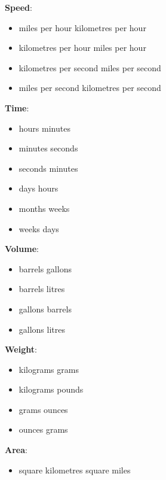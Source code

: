 \documentclass[11pt]{article}
\begin{document}
\noindent \textbf{Speed}:
\begin{itemize}
    \setlength\itemsep{0.05em}
    \item miles per hour  kilometres per hour
    \item kilometres per hour  miles per hour
    \item kilometres per second  miles per second
    \item miles per second  kilometres per second
\end{itemize}

\noindent \textbf{Time}:
\begin{itemize}
    \setlength\itemsep{0.05em}
    \item hours  minutes
    \item minutes  seconds
    \item seconds  minutes
    \item days  hours
    \item months  weeks
    \item weeks  days
\end{itemize}

\noindent \textbf{Volume}:
\begin{itemize}
    \setlength\itemsep{0.05em}
    \item barrels  gallons
    \item barrels  litres
    \item gallons  barrels
    \item gallons  litres
\end{itemize}

\noindent \textbf{Weight}:
\begin{itemize}
    \setlength\itemsep{0.05em}
    \item kilograms  grams
    \item kilograms  pounds
    \item grams  ounces
    \item ounces  grams
\end{itemize}

\noindent \textbf{Area}:
\begin{itemize}
    \item square kilometres  square miles
\end{itemize}

\vspace{1em} 
\end{document}
